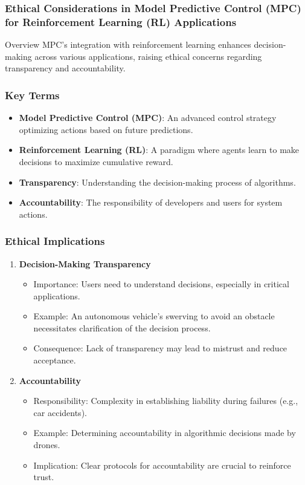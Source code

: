 \documentclass[aspectratio=169]{beamer}
\begin{document}
\begin{frame}[fragile]
    \frametitle{Ethical Considerations in Model Predictive Control (MPC) for Reinforcement Learning (RL) Applications}
    \begin{block}{Overview}
        MPC's integration with reinforcement learning enhances decision-making across various applications, raising ethical concerns regarding transparency and accountability.
    \end{block}
\end{frame}

\begin{frame}[fragile]
    \frametitle{Key Terms}
    \begin{itemize}
        \item \textbf{Model Predictive Control (MPC)}: An advanced control strategy optimizing actions based on future predictions.
        \item \textbf{Reinforcement Learning (RL)}: A paradigm where agents learn to make decisions to maximize cumulative reward.
        \item \textbf{Transparency}: Understanding the decision-making process of algorithms.
        \item \textbf{Accountability}: The responsibility of developers and users for system actions.
    \end{itemize}
\end{frame}

\begin{frame}[fragile]
    \frametitle{Ethical Implications}
    \begin{enumerate}
        \item \textbf{Decision-Making Transparency}
            \begin{itemize}
                \item Importance: Users need to understand decisions, especially in critical applications.
                \item Example: An autonomous vehicle's swerving to avoid an obstacle necessitates clarification of the decision process.
                \item Consequence: Lack of transparency may lead to mistrust and reduce acceptance.
            \end{itemize}
            
        \item \textbf{Accountability}
            \begin{itemize}
                \item Responsibility: Complexity in establishing liability during failures (e.g., car accidents).
                \item Example: Determining accountability in algorithmic decisions made by drones.
                \item Implication: Clear protocols for accountability are crucial to reinforce trust.
            \end{itemize}
    \end{enumerate}
\end{frame}
\end{document}
